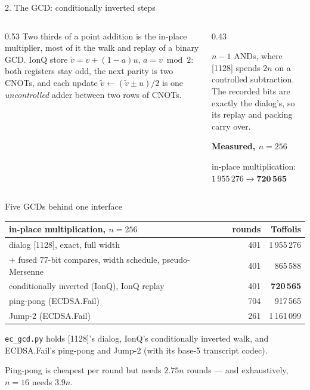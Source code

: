 \documentclass[aspectratio=169,11pt]{beamer}
\newcommand{\peachtitle}[1]{{\bfseries\color{cverm}#1}\par\vskip1mm}
\newcommand{\code}[2][]{}
\begin{document}
\setcounter{framenumber}{166}
\begin{frame}[fragile]{2. The GCD: conditionally inverted steps}
  \begin{columns}[T]
    \begin{column}{0.53\textwidth}
      Two thirds of a point addition is the in-place multiplier, most of it the walk and replay of a binary GCD.
      \vskip2mm
      IonQ store $\tilde v=v+(1-a)u$, $a=v\bmod2$: both registers stay odd, the next parity is two CNOTs, and each update $\tilde v\leftarrow(\tilde v\pm u)/2$ is one \emph{uncontrolled} adder between two rows of CNOTs.
    \end{column}
    \begin{column}{0.43\textwidth}
      \code[basicstyle=\ttfamily\footnotesize]{ci_add.py}
      \vskip1mm
      {\small $n-1$ ANDs, where [1128] spends $2n$ on a controlled subtraction. The recorded bits are exactly the dialog's, so its replay and packing carry over.}
      \begin{peachblock}\peachtitle{Measured, $n=256$}
        in-place multiplication: $1\,955\,276\to\mathbf{720\,565}$
      \end{peachblock}
    \end{column}
  \end{columns}
\end{frame}

\setcounter{framenumber}{167}
\begin{frame}{Five GCDs behind one interface}
  \centering\small
  \renewcommand{\arraystretch}{1.15}
  \begin{tabular}{@{}lrr@{}}
    \toprule
    in-place multiplication, $n=256$ & rounds & Toffolis \\
    \midrule
    dialog [1128], exact, full width & 401 & 1\,955\,276 \\
    $+$ fused 77-bit compares, width schedule, pseudo-Mersenne & 401 & 865\,588 \\
    conditionally inverted (IonQ), IonQ replay & 401 & \textbf{720\,565} \\
    ping-pong (ECDSA.Fail) & 704 & 917\,565 \\
    Jump-2 (ECDSA.Fail) & 261 & 1\,161\,099 \\
    \bottomrule
  \end{tabular}
  \vskip3mm
  \raggedright \texttt{ec\_gcd.py} holds [1128]'s dialog, IonQ's conditionally inverted walk, and ECDSA.Fail's ping-pong and Jump-2 (with its base-5 transcript codec).
  \begin{takeaway}Ping-pong is cheapest per round but needs $2.75n$ rounds --- and exhaustively, $n=16$ needs $3.9n$.\end{takeaway}
\end{frame}
\end{document}
